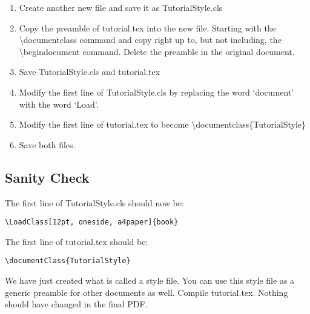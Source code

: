 \begin{enumerate}
\item Create another new file and save it as TutorialStyle.cls
\item Copy the preamble of tutorial.tex into the new file. Starting with the {\textbackslash}documentclass{} command and copy right up to, but not including, the {\textbackslash}begin{document} command. Delete the preamble in the original document.
\item Save TutorialStyle.cls and tutorial.tex
\item Modify the first line of TutorialStyle.cls by replacing the word `document' with the word `Load'.
\item Modify the first line of tutorial.tex to become {\textbackslash}documentclass\{TutorialStyle\}
\item Save both files.
\end{enumerate}

\subsection{Sanity Check}

The first line of TutorialStyle.cls should now be:

\begin{verbatim}
\LoadClass[12pt, oneside, a4paper]{book}
\end{verbatim}
\vspace{2ex}

The first line of tutorial.tex should be:

\begin{verbatim}
\documentClass{TutorialStyle}
\end{verbatim}
\vspace{2ex}

We have just created what is called a style file. You can use this style file as a generic preamble for other documents as well. Compile tutorial.tex.  Nothing should have changed in the final PDF.




